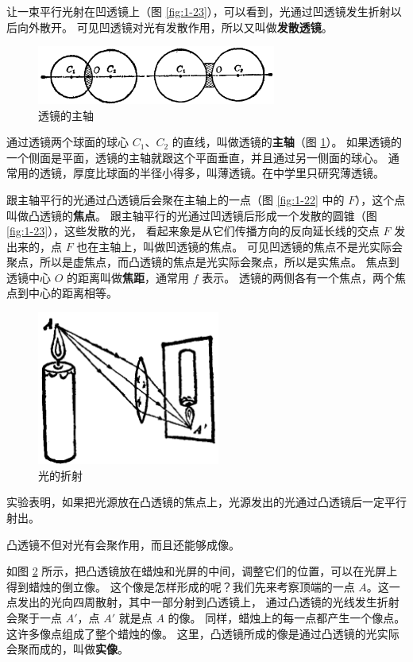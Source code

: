 让一束平行光射在凹透镜上（图 \ref{fig:1-23}），可以看到，光通过凹透镜发生折射以后向外散开。
可见凹透镜对光有发散作用，所以又叫做\textbf{发散透镜}。

\begin{figure}[htbp]
    \centering
    \includegraphics[width=0.7\textwidth]{../pic/czwl2-ch1-24}
    \caption{透镜的主轴}\label{fig:1-24}
\end{figure}

通过透镜两个球面的球心 $C_1$、$C_2$ 的直线，叫做透镜的\textbf{主轴}（图 \ref{fig:1-24}）。
如果透镜的一个侧面是平面，透镜的主轴就跟这个平面垂直，并且通过另一侧面的球心。
通常用的透镜，厚度比球面的半径小得多，叫薄透镜。在中学里只研究薄透镜。

跟主轴平行的光通过凸透镜后会聚在主轴上的一点（图 \ref{fig:1-22} 中的 $F$），这个点叫做凸透镜的\textbf{焦点}。
跟主轴平行的光通过凹透镜后形成一个发散的圆锥（图 \ref{fig:1-23}），这些发散的光，
看起来象是从它们传播方向的反向延长线的交点 $F$ 发出来的，点 $F$ 也在主轴上，叫做凹透镜的焦点。
可见凹透镜的焦点不是光实际会聚点，所以是虚焦点，而凸透镜的焦点是光实际会聚点，所以是实焦点。
焦点到透镜中心 $O$ 的距离叫做\textbf{焦距}，通常用 $f$ 表示。
透镜的两侧各有一个焦点，两个焦点到中心的距离相等。

\begin{figure}
    \centering
    \includegraphics[width=6cm]{../pic/czwl2-ch1-25}
    \caption{光的折射}\label{fig:1-25}
\end{figure}

实验表明，如果把光源放在凸透镜的焦点上，光源发出的光通过凸透镜后一定平行射出。

凸透镜不但对光有会聚作用，而且还能够成像。

如图 \ref{fig:1-25} 所示，把凸透镜放在蜡烛和光屏的中间，调整它们的位置，可以在光屏上得到蜡烛的倒立像。
这个像是怎样形成的呢？我们先来考察顶端的一点 $A$。这一点发出的光向四周散射，其中一部分射到凸透镜上，
通过凸透镜的光线发生折射会聚于一点 $A'$，点 $A'$ 就是点 $A$ 的像。
同样，蜡烛上的每一点都产生一个像点。这许多像点组成了整个蜡烛的像。
这里，凸透镜所成的像是通过凸透镜的光实际会聚而成的，叫做\textbf{实像}。


